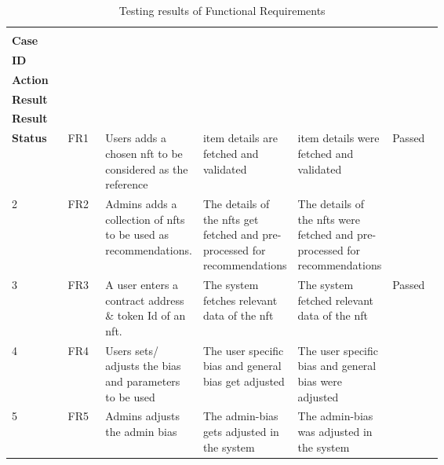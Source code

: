 \vspace{-4mm}
\begin{longtable}{|l|l|p{0.22\linewidth}|p{0.21\linewidth}|p{0.21\linewidth}|l|}
\caption{Testing results of Functional Requirements}
\label{tab:test-func-requirements}
\\ 
\hline
\begin{tabular}[c]{@{}l@{}}\textbf{Test}\\\textbf{Case}\end{tabular}
&
\begin{tabular}[c]{@{}l@{}}\textbf{FR}\\\textbf{ID}\end{tabular}
&
\begin{tabular}[c]{@{}c@{}}\textbf{User}\\\textbf{Action}\end{tabular}
&
\begin{tabular}[c]{@{}c@{}}\textbf{Expected}\\\textbf{Result}\end{tabular} & 
\begin{tabular}[c]{@{}c@{}}\textbf{Actual}\\\textbf{Result}\end{tabular} & \begin{tabular}[c]{@{}c@{}}\textbf{Result}\\\textbf{Status}\end{tabular}
\endfirsthead 
\hline
1 & FR1 & Users adds a chosen \gls{nft} to be considered as the reference & item details are fetched and validated & item details were fetched and validated & Passed \\ 
\hline
2 & FR2 & Admins adds a collection of \gls{nft}s to be used as recommendations. & The details of the \gls{nft}s get fetched and pre-processed for recommendations & The details of the \gls{nft}s were fetched and pre-processed for recommendations & \\ 
\hline
3 & FR3 & A user enters a contract address \& token Id of an \gls{nft}. & The system fetches relevant data of the \gls{nft} & The system fetched relevant data of the \gls{nft} & Passed \\ 
\hline
4 & FR4 & Users sets/ adjusts the bias and parameters to be used & The user specific bias and general bias get adjusted & The user specific bias and general bias were adjusted & \\
\hline
5 & FR5 & Admins adjusts the admin bias & The admin-bias gets adjusted in the system & The admin-bias was adjusted in the system & \\ 

\end{longtable}
